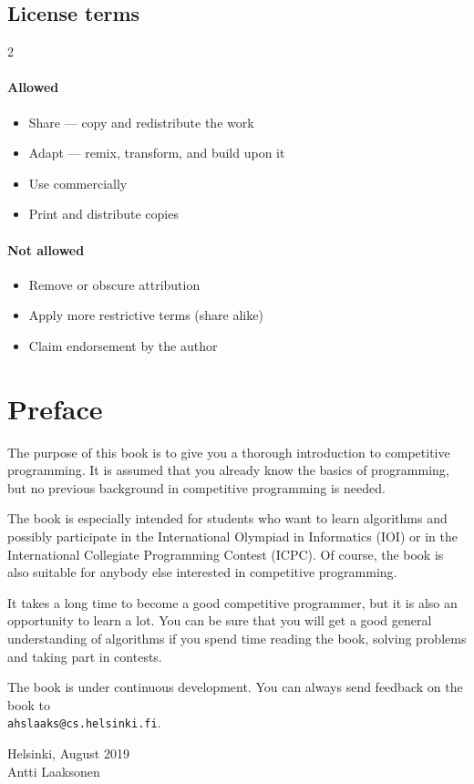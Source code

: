 \section*{License terms}
\begin{multicols}{2}
\subsubsection*{Allowed}
\begin{itemize}[nosep,leftmargin=*]
\item Share --- copy and redistribute the work
\item Adapt --- remix, transform, and build upon it
\item Use commercially
\item Print and distribute copies
\end{itemize}
\columnbreak
\subsubsection*{Not allowed}
\begin{itemize}[nosep,leftmargin=*]
\item Remove or obscure attribution
\item Apply more restrictive terms (share alike)
\item Claim endorsement by the author
\end{itemize}
\end{multicols}

\clearpage

\let\cleardoublepage\clearpage

\chapter*{Preface}

The purpose of this book is to give you
a thorough introduction to competitive programming.
It is assumed that you already
know the basics of programming, but no previous
background in competitive programming is needed.

The book is especially intended for
students who want to learn algorithms and
possibly participate in
the International Olympiad in Informatics (IOI) or
in the International Collegiate Programming Contest (ICPC).
Of course, the book is also suitable for 
anybody else interested in competitive programming.

It takes a long time to become a good competitive
programmer, but it is also an opportunity to learn a lot.
You can be sure that you will get
a good general understanding of algorithms
if you spend time reading the book,
solving problems and taking part in contests.

The book is under continuous development.
You can always send feedback on the book to
\\
\texttt{ahslaaks@cs.helsinki.fi}.

\begin{flushright}
Helsinki, August 2019 \\
Antti Laaksonen
\end{flushright}
